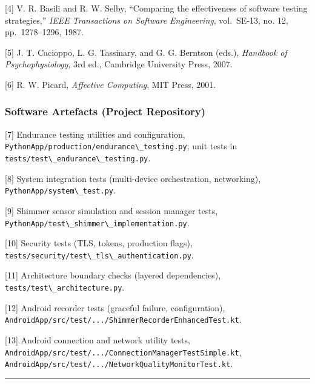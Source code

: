 \documentclass[12pt,a4paper]{article}
\begin{document}
{[}4{]} V. R. Basili and R. W. Selby, ``Comparing the effectiveness of software testing strategies,'' \emph{IEEE Transactions on Software Engineering}, vol.~SE-13, no. 12, pp.~1278--1296, 1987.

{[}5{]} J. T. Cacioppo, L. G. Tassinary, and G. G. Berntson (eds.), \emph{Handbook of Psychophysiology}, 3rd ed., Cambridge University Press, 2007.

{[}6{]} R. W. Picard, \emph{Affective Computing}, MIT Press, 2001.

\subsubsection{Software Artefacts (Project Repository)}\label{software-artefacts-project-repository}

{[}7{]} Endurance testing utilities and configuration, \passthrough{\lstinline!PythonApp/production/endurance\_testing.py!}; unit tests in \passthrough{\lstinline!tests/test\_endurance\_testing.py!}.

{[}8{]} System integration tests (multi-device orchestration, networking), \passthrough{\lstinline!PythonApp/system\_test.py!}.

{[}9{]} Shimmer sensor simulation and session manager tests, \passthrough{\lstinline!PythonApp/test\_shimmer\_implementation.py!}.

{[}10{]} Security tests (TLS, tokens, production flags), \passthrough{\lstinline!tests/security/test\_tls\_authentication.py!}.

{[}11{]} Architecture boundary checks (layered dependencies), \passthrough{\lstinline!tests/test\_architecture.py!}.

{[}12{]} Android recorder tests (graceful failure, configuration), \passthrough{\lstinline!AndroidApp/src/test/.../ShimmerRecorderEnhancedTest.kt!}.

{[}13{]} Android connection and network utility tests, \passthrough{\lstinline!AndroidApp/src/test/.../ConnectionManagerTestSimple.kt!}, \passthrough{\lstinline!AndroidApp/src/test/.../NetworkQualityMonitorTest.kt!}.

\begin{center}\rule{0.5\linewidth}{0.5pt}\end{center}
\end{document}
